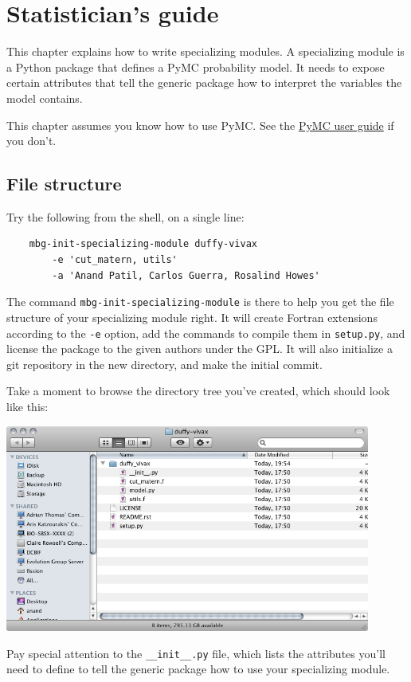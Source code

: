 \chapter{Statistician's guide} 
\label{chap:stat}

This chapter explains how to write specializing modules. A specializing module is a Python package that defines a PyMC probability model. It needs to expose certain attributes that tell the generic package how to interpret the variables the model contains.

This chapter assumes you know how to use PyMC. See the \href{http://code.google.com/p/pymc/}{PyMC user guide} if you don't.




\section{File structure} 
Try the following from the shell, on a single line:
\begin{verbatim}
    mbg-init-specializing-module duffy-vivax 
        -e 'cut_matern, utils' 
        -a 'Anand Patil, Carlos Guerra, Rosalind Howes'
\end{verbatim}
The command \texttt{mbg-init-specializing-module} is there to help you get the file structure of your specializing module right. It will create Fortran extensions according to the \texttt{-e} option, add the commands to compile them in \texttt{setup.py}, and license the package to the given authors under the GPL. It will also initialize a git repository in the new directory, and make the initial commit.


Take a moment to browse the directory tree you've created, which should look like this:
\begin{center}
\includegraphics[width=12cm]{filestructure.png}     
\end{center}
Pay special attention to the \texttt{\_\_init\_\_.py} file, which lists the attributes you'll need to define to tell the generic package how to use your specializing module.


